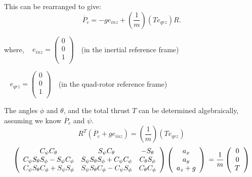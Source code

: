 This can be rearranged to give:
\begin{equation}
    \label{eq:acc_from_model}
    \ddot{P_c} = - g e_{inz} + \left(\frac{1}{m}\right) \left(T e_{qrz}\right) R .
\end{equation}

where,
\mbox{ } \hspace{.5in} $ e_{inz} = \left( \begin{array}{c}
0\\0\\1\\
\end{array}\right) \text{  }$ (in the inertial reference frame)

\mbox{ } \hspace{1in} $ e_{qrz} = \left( \begin{array}{c}
0\\0\\1\\
\end{array}\right) \text{  }$  (in the quad-rotor reference frame)

The angles $\phi$ and $\theta$, and the total thrust $T$ can be determined algebraically, assuming we know $\ddot{P_c}$ and $\psi$.\\

\begin{equation}
    \label{eq:thrustTransformation}
    R^T \left( \ddot{P_c} + g e_{inz}\right) = \left(\frac{1}{m}\right) \left(T e_{qrz}\right)
\end{equation}
\begin{equation}
    \left( \begin{array}{ccc}
        C_{\psi} C_{\theta} & S_{\psi} C_{\theta} & -S_{\theta}\\
        C_{\psi} S_{\theta} S_{\phi} - S_{\psi} C_{\phi} & S_{\psi} S_{\theta} S_{\phi} + C_{\psi} C_{\phi} & C_{\theta} S_{\phi}\\
        C_{\psi} S_{\theta} C_{\phi} + S_{\psi} S_{\phi} & S_{\psi} S_{\theta} C_{\phi} - C_{\psi} S_{\phi} & C_{\theta} C_{\phi}\\
    \end{array} \right)\left( \begin{array}{c} a_x\\a_y\\a_z+g\\\end{array} \right)\\
    = \frac{1}{m} \left( \begin{array}{c} 0\\0\\T\\ \end{array} \right)
\end{equation}


